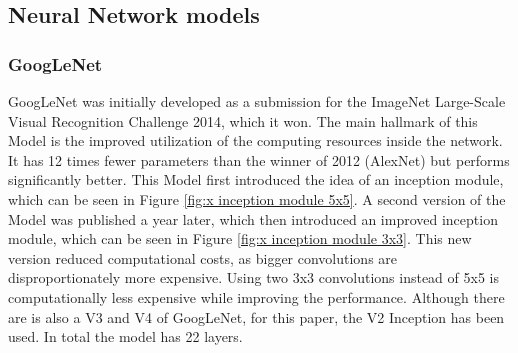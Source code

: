 \documentclass[conference]{IEEEtran}
\begin{document}
\subsection{Neural Network models}
\subsubsection{GoogLeNet}
GoogLeNet was initially developed as a submission for the ImageNet Large-Scale Visual Recognition Challenge 2014, which it won. The main hallmark of this Model is the improved utilization of the computing resources inside the network. It has 12 times fewer parameters than the winner of 2012 (AlexNet) but performs significantly better. \cite{szegedy_going_2014}
This Model first introduced the idea of an inception module, which can be seen in Figure \ref{fig:x inception module 5x5}.
A second version of the Model was published a year later, which then introduced an improved inception module, which can be seen in Figure \ref{fig:x inception module 3x3}.
This new version reduced computational costs, as bigger convolutions are disproportionately more expensive. Using two 3x3 convolutions instead of 5x5 is computationally less expensive while improving the performance.
Although there are is also a V3 and V4 of GoogLeNet, for this paper, the V2 Inception has been used.
In total the model has 22 layers.
\end{document}
